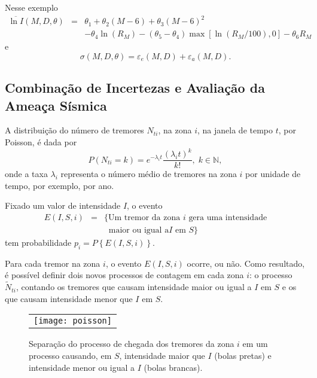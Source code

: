 Nesse exemplo
\begin{equation}
\begin{array}{lcl}
\overline{\ln I}(M, D, \theta) & = & \theta_1 + \theta_2(M-6) + \theta_3(M-6)^2  \\
& & - \theta_4\ln (R_M)
-(\theta_5 - \theta_4)\max\left[ \ln\left( R_M / 100 \right), 0 \right]
-\theta_6 R_M
\end{array}
\end{equation}
e
\begin{equation}
	\sigma(M, D, \theta)=\varepsilon_e(M,D) + \varepsilon_a(M,D).
\end{equation}


\subsection{Combinação de Incertezas e Avaliação da Ameaça Sísmica}
\label{sec:hazard}

A distribuição do número de tremores $N_{t i}$, na zona $i$, na janela de tempo $t$, por Poisson,
é dada por
$$
P(N_{t i}=k)=e^{-\lambda_i t} \frac{(\lambda_i t)^k}{k!},\;k \in \mathbb{N},
$$
onde a taxa $\lambda_i$ representa o número médio de tremores na zona
$i$ por unidade de tempo, por exemplo, por ano.

Fixado um valor de intensidade $I$, o evento
\begin{equation} \label{formulapi}
\begin{array}{lll}
E(I, S, i)  & =  & \{ \mbox{Um tremor da zona }i \mbox{ gera uma intensidade} \\
&  &  \;\;\mbox{maior ou igual a} I \mbox{ em }S \}
\end{array}
\end{equation}
tem probabilidade $p_i=P \left\{ E(I, S, i)\right\}$.

Para cada tremor na zona $i$, o evento $E(I, S, i)$ ocorre, ou não.
Como resultado, é possível definir dois novos processos de contagem
em cada zona $i$: o processo $\tilde N_{t i}$, contando os tremores que
causam intensidade maior ou igual a $I$ em $S$ e os que causam intensidade menor que $I$ em $S$.

\begin{figure}[H]
	\centering
	\begin{tabular}{l}
	\texttt{[image: poisson]}
	\end{tabular}
	\caption{Separação do processo de chegada dos tremores da zona $i$
	em um processo causando, em $S$, intensidade maior que $I$ (bolas pretas) e intensidade
	menor ou igual a $I$ (bolas brancas).}
\label{fig:poisson}
\end{figure}

